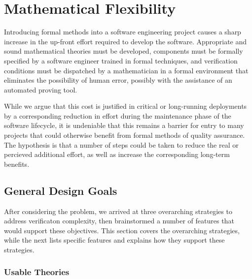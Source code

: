 


\chapter{Mathematical Flexibility\label{ch:math}}

Introducing formal methods into a software engineering project causes a sharp increase in the up-front effort required to develop the software.  Appropriate and sound mathematical theories must be developed, components must be formally specified by a software engineer trained in formal techniques, and verification conditions must be dispatched by a mathematician in a formal environment that eliminates the possibility of human error, possibly with the assistance of an automated proving tool.

While we argue that this cost is justified in critical or long-running deployments by a corresponding reduction in effort during the maintenance phase of the software lifecycle, it is undeniable that this remains a barrier for entry to many projects that could otherwise benefit from formal methods of quality assurance.  The hypothesis is that a number of steps could be taken to reduce the real or percieved additional effort, as well as increase the corresponding long-term benefits.

\section{General Design Goals\label{mathDesignGoals}}

After considering the problem, we arrived at three overarching strategies to address verificaton complexity, then brainstormed a number of features that would support these objectives.  This section covers the overarching strategies, while the next lists specific features and explains how they support these strategies. 

	\subsection{Usable Theories\label{usableTheories}}

